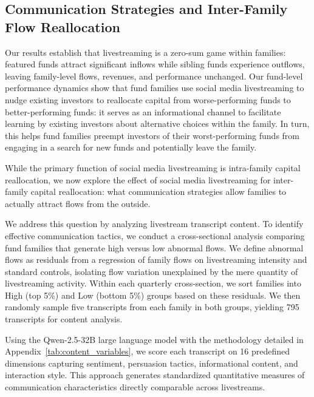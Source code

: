 \documentclass[12pt]{article}
\begin{document}
\subsection{Communication Strategies and Inter-Family Flow Reallocation}\label{subsec:communication_strategies}

Our results establish that livestreaming is a zero-sum game within families: featured funds attract significant inflows while sibling funds experience outflows, leaving family-level flows, revenues, and performance unchanged. Our fund-level performance dynamics show that fund families use social media livestreaming to nudge existing investors to reallocate capital from worse-performing funds to better-performing funds: it serves as an informational channel to facilitate learning by existing investors about alternative choices within the family. In turn, this helps fund families preempt investors of their worst-performing funds from engaging in a search for new funds and potentially leave the family.

While the primary function of social media livestreaming is intra-family capital reallocation, we now explore the effect of social media livestreaming for inter-family capital reallocation: what communication strategies allow families to actually attract flows from the outside.

We address this question by analyzing livestream transcript content. To identify effective communication tactics, we conduct a cross-sectional analysis comparing fund families that generate high versus low abnormal flows. We define abnormal flows as residuals from a regression of family flows on livestreaming intensity and standard controls, isolating flow variation unexplained by the mere quantity of livestreaming activity. Within each quarterly cross-section, we sort families into High (top 5\%) and Low (bottom 5\%) groups based on these residuals. We then randomly sample five transcripts from each family in both groups, yielding 795 transcripts for content analysis.

Using the Qwen-2.5-32B large language model with the methodology detailed in Appendix~\ref{tab:content_variables}, we score each transcript on 16 predefined dimensions capturing sentiment, persuasion tactics, informational content, and interaction style. This approach generates standardized quantitative measures of communication characteristics directly comparable across livestreams. %
\end{document}
